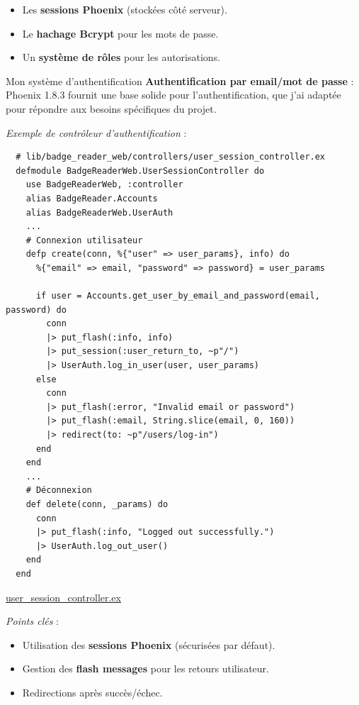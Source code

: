 \begin{itemize}
    \item Les \textbf{sessions Phoenix} (stockées côté serveur).
    \item Le \textbf{hachage Bcrypt} pour les mots de passe.
    \item Un \textbf{système de rôles} pour les autorisations.
    \newline
\end{itemize}

\begin{for_you}{Mon système d’authentification}
    \textbf{Authentification par email/mot de passe} :
    Phoenix 1.8.3 fournit une base solide pour l’authentification, que j’ai adaptée pour répondre aux besoins spécifiques du projet.
    \newline

    \textit{Exemple de contrôleur d’authentification} :
    \begin{lstlisting}
  # lib/badge_reader_web/controllers/user_session_controller.ex
  defmodule BadgeReaderWeb.UserSessionController do
    use BadgeReaderWeb, :controller
    alias BadgeReader.Accounts
    alias BadgeReaderWeb.UserAuth
    ...
    # Connexion utilisateur
    defp create(conn, %{"user" => user_params}, info) do
      %{"email" => email, "password" => password} = user_params

      if user = Accounts.get_user_by_email_and_password(email, password) do
        conn
        |> put_flash(:info, info)
        |> put_session(:user_return_to, ~p"/")
        |> UserAuth.log_in_user(user, user_params)
      else
        conn
        |> put_flash(:error, "Invalid email or password")
        |> put_flash(:email, String.slice(email, 0, 160))
        |> redirect(to: ~p"/users/log-in")
      end
    end
    ...
    # Déconnexion
    def delete(conn, _params) do
      conn
      |> put_flash(:info, "Logged out successfully.")
      |> UserAuth.log_out_user()
    end
  end
    \end{lstlisting}

    \href{https://github.com/Theoden-bernard/badge_reader_project/blob/develop/badge_reader/lib/badge_reader_web/controllers/user_session_controller.ex}{user\_session\_controller.ex \newline}

    \textit{Points clés} :
    \begin{itemize}
        \item Utilisation des \textbf{sessions Phoenix} (sécurisées par défaut).
        \item Gestion des \textbf{flash messages} pour les retours utilisateur.
        \item Redirections après succès/échec.
    \end{itemize}
\end{for_you}

